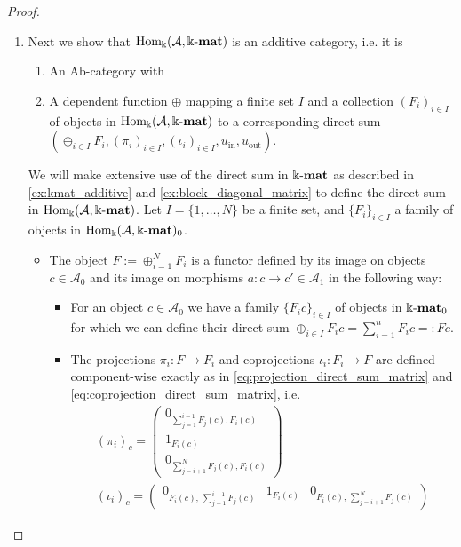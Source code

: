 \begin{proof}
\begin{enumerate}
\item Next we show that $\mathrm{Hom_{\Bbbk}}(\mathcal{A},\Bbbk\textnormal{-}\mathbf{mat})$ is an additive category, i.e. it is
\begin{enumerate}
\renewcommand{\labelenumii}{(\roman{enumii})}
\item An Ab-category with
\item A dependent function $\oplus$ mapping a finite set $I$ and a collection $(F_{i})_{i\in I}$ of objects in $\mathrm{Hom_{\Bbbk}}(\mathcal{A},\Bbbk\textnormal{-}\mathbf{mat})$
to a corresponding direct sum $( \oplus_{i\in I} F_{i}, (\pi_{i})_{i\in I}, (\iota_{i})_{i\in I}, u_{\mathrm{in}}, u_{\mathrm{out}} )$.
\end{enumerate}
\begin{subproof}[Proof of (ii)]
We will make extensive use of the direct sum in $\Bbbk\textnormal{-}\mathbf{mat}$ as described in \ref{ex:kmat_additive} and \ref{ex:block_diagonal_matrix} to
define the direct sum in $\mathrm{Hom_{\Bbbk}}(\mathcal{A},\Bbbk\textnormal{-}\mathbf{mat})$.
Let $I = \{1,\dots,N\}$ be a finite set, and $\{F_{i} \}_{i \in I}$ a family of objects in $\mathrm{Hom_{\Bbbk}}(\mathcal{A},\Bbbk\textnormal{-}\mathbf{mat})_{0}$.
\begin{itemize}
\item The object $F := \oplus_{i=1}^{N} F_{i}$ is a functor defined by its image on objects $c \in \mathcal{A}_{0}$ and its
image on morphisms $a : c \rightarrow c' \in \mathcal{A}_{1}$ in the following way:
\begin{itemize}
\item For an object $c \in \mathcal{A}_{0}$ we have a family $\{F_{i} c \}_{i \in I}$ of objects in $\Bbbk\textnormal{-}\mathbf{mat}_{0}$ for which we can define
their direct sum $\oplus_{i \in I} F_{i} c = \sum_{i=1}^{n} F_{i} c =: F c$.
\item The projections $\pi_{i} : F \rightarrow F_{i}$ and coprojections $\iota_{i} : F_{i} \rightarrow F$ are defined component-wise
exactly as in \eqref{eq:projection_direct_sum_matrix} and \eqref{eq:coprojection_direct_sum_matrix}, i.e.
\begin{align}
(\pi_{i})_{c} =
\begin{pmatrix}
0_{\sum_{j=1}^{i-1} F_{j}(c), F_{i}(c)} \\
1_{F_{i}(c)} \\
0_{\sum_{j=i+1}^{N} F_{j}(c), F_{i}(c)}
\end{pmatrix} \\
(\iota_{i})_{c} = 
\begin{pmatrix}
0_{F_{i}(c),\,\sum\limits_{j=1}^{i-1} F_{j}(c)} & 1_{F_{i}(c)} & 0_{F_{i}(c),\,\sum\limits_{j=i+1}^{N} F_{j}(c)}
\end{pmatrix}
\end{align}


\end{itemize}
\end{itemize}
\end{subproof}
\end{enumerate}
\end{proof}
